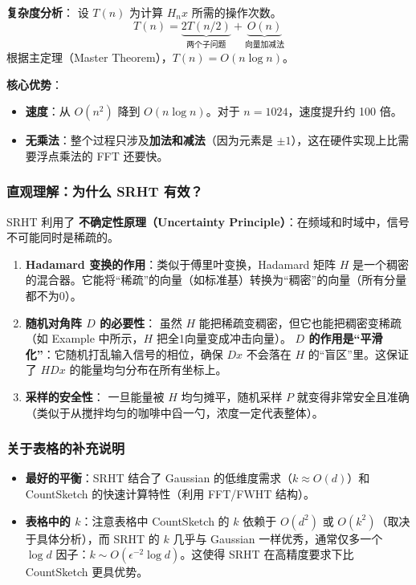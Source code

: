 \documentclass[11pt,a4paper]{ctexart}
\theoremstyle{definition}
\theoremstyle{remark}
\begin{document}
\textbf{复杂度分析}：
设 $T(n)$ 为计算 $H_n x$ 所需的操作次数。
\[
T(n) = \underbrace{2 T(n/2)}_{\text{两个子问题}} + \underbrace{O(n)}_{\text{向量加减法}}
\]
根据主定理（Master Theorem），$T(n) = O(n \log n)$。

\textbf{核心优势}：
\begin{itemize}
    \item \textbf{速度}：从 $O(n^2)$ 降到 $O(n \log n)$。对于 $n=1024$，速度提升约 100 倍。
    \item \textbf{无乘法}：整个过程只涉及\textbf{加法和减法}（因为元素是 $\pm 1$），这在硬件实现上比需要浮点乘法的 FFT 还要快。
\end{itemize}

\subsubsection*{直观理解：为什么 SRHT 有效？}

SRHT 利用了 \textbf{不确定性原理（Uncertainty Principle）}：在频域和时域中，信号不可能同时是稀疏的。

\begin{enumerate}
    \item \textbf{Hadamard 变换的作用}：类似于傅里叶变换，Hadamard 矩阵 $H$ 是一个稠密的混合器。它能将“稀疏”的向量（如标准基）转换为“稠密”的向量（所有分量都不为0）。
    
    \item \textbf{随机对角阵 $D$ 的必要性}：
    虽然 $H$ 能把稀疏变稠密，但它也能把稠密变稀疏（如 Example 中所示，$H$ 把全1向量变成冲击向量）。
    \textbf{$D$ 的作用是“平滑化”}：它随机打乱输入信号的相位，确保 $Dx$ 不会落在 $H$ 的“盲区”里。这保证了 $HDx$ 的能量均匀分布在所有坐标上。
    
    \item \textbf{采样的安全性}：
    一旦能量被 $H$ 均匀摊平，随机采样 $P$ 就变得非常安全且准确（类似于从搅拌均匀的咖啡中舀一勺，浓度一定代表整体）。
\end{enumerate}

\subsubsection*{关于表格的补充说明}
\begin{itemize}
    \item \textbf{最好的平衡}：SRHT 结合了 Gaussian 的低维度需求（$k \approx O(d)$）和 CountSketch 的快速计算特性（利用 FFT/FWHT 结构）。
    \item \textbf{表格中的 $k$}：注意表格中 CountSketch 的 $k$ 依赖于 $O(d^2)$ 或 $O(k^2)$（取决于具体分析），而 SRHT 的 $k$ 几乎与 Gaussian 一样优秀，通常仅多一个 $\log d$ 因子：$k \sim O(\epsilon^{-2} \log d)$。这使得 SRHT 在高精度要求下比 CountSketch 更具优势。
\end{itemize}
\end{document}
